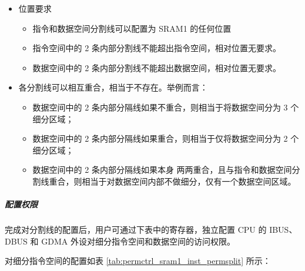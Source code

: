 \documentclass[main\_\_CN.tex]{subfiles}
\begin{document}
 \begin{itemize}
     \item 位置要求
     \begin{itemize}
         \item 指令和数据空间分割线可以配置为 SRAM1 的任何位置
         \item 指令空间中的 2 条内部分割线不能超出指令空间，相对位置无要求。
         \item 数据空间中的 2 条内部分割线不能超出数据空间，相对位置无要求。
     \end{itemize}
     \item 各分割线可以相互重合，相当于不存在。举例而言：
     \begin{itemize}
         \item 数据空间中的 2 条内部分隔线如果不重合，则相当于将数据空间分为 3 个细分区域；
         \item 数据空间中的 2 条内部分隔线如果重合，则相当于仅将数据空间分为 2 个细分区域；
         \item 数据空间中的 2 条内部分隔线如果本身 两两重合，且与指令和数据空间分割线重合，则相当于对数据空间内部不做细分，仅有一个数据空间区域。
     \end{itemize}
     \end{itemize}

\subparagraph{配置权限}

完成对分割线的配置后，用户可通过下表中的寄存器，独立配置 CPU 的 IBUS、DBUS 和 GDMA 外设对细分指令空间和数据空间的访问权限。

对细分指令空间的配置如表 \ref{tab:permctrl_sram1_inst_permsplit} 所示：
\end{document}
